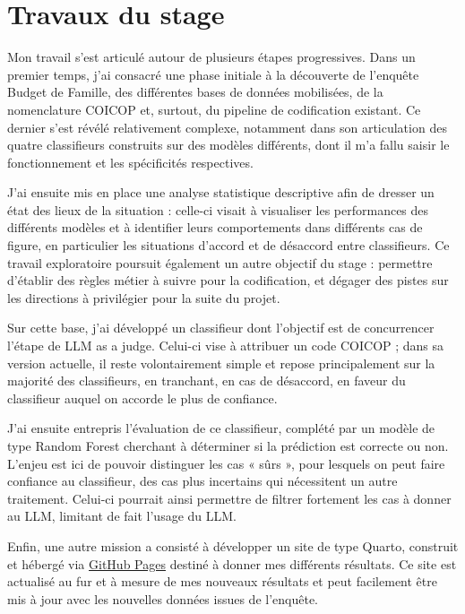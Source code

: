 \documentclass{rapportCS}
\begin{document}
\section{Travaux du stage}

Mon travail s'est articulé autour de plusieurs étapes progressives. Dans un premier temps, j'ai consacré une phase initiale à la découverte de l'enquête Budget de Famille, des différentes bases de données mobilisées, de la nomenclature COICOP et, surtout, du pipeline de codification existant. Ce dernier s'est révélé relativement complexe, notamment dans son articulation des quatre classifieurs construits sur des modèles différents, dont il m'a fallu saisir le fonctionnement et les spécificités respectives. \newline

J'ai ensuite mis en place une analyse statistique descriptive afin de dresser un état des lieux de la situation : celle-ci visait à visualiser les performances des différents modèles et à identifier leurs comportements dans différents cas de figure, en particulier les situations d'accord et de désaccord entre classifieurs. Ce travail exploratoire poursuit également un autre objectif du stage : permettre d'établir des règles métier à suivre pour la codification, et dégager des pistes sur les directions à privilégier pour la suite du projet. \newline

Sur cette base, j'ai développé un classifieur dont l'objectif est de concurrencer l'étape de LLM as a judge. Celui-ci vise à attribuer un code COICOP ; dans sa version actuelle, il reste volontairement simple et repose principalement sur la majorité des classifieurs, en tranchant, en cas de désaccord, en faveur du classifieur auquel on accorde le plus de confiance. \newline

J'ai ensuite entrepris l'évaluation de ce classifieur, complété par un modèle de type Random Forest cherchant à déterminer si la prédiction est correcte ou non. L'enjeu est ici de pouvoir distinguer les cas « sûrs », pour lesquels on peut faire confiance au classifieur, des cas plus incertains qui nécessitent un autre traitement. Celui-ci pourrait ainsi permettre de filtrer fortement les cas à donner au LLM, limitant de fait l'usage du LLM. \newline

Enfin, une autre mission a consisté à développer un site de type Quarto, construit et hébergé via  \href{https://mathiskacer.github.io/codification_auto_coicop}{GitHub Pages} destiné à donner mes différents résultats. Ce site est actualisé au fur et à mesure de mes nouveaux résultats et peut facilement être mis à jour avec les nouvelles données issues de l'enquête.
\end{document}
